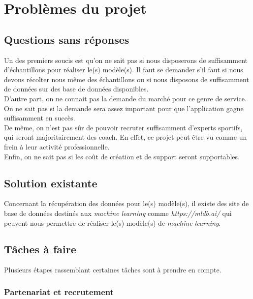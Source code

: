 
\chapter{Problèmes du projet}

\section{Questions sans réponses}

Un des premiers soucis est qu'on ne sait pas si nous disposerons de suffisamment d'échantillons pour réaliser le(s) modèle(s). Il faut se demander s'il faut si nous devons récolter nous même des échantillons ou si nous disposons de suffisamment de données sur des base de données disponibles.\\

D'autre part, on ne connait pas la demande du marché pour ce genre de service. On ne sait pas si la demande sera assez important pour que l'application gagne suffisamment en succès.\\

De même, on n'est pas sûr de pouvoir recruter suffisamment d'experts sportifs, qui seront majoritairement des coach. En effet, ce projet peut être vu comme un frein à leur activité professionnelle.\\ 

Enfin, on ne sait pas si les coût de création et de support seront supportables.  

\section{Solution existante}

Concernant la récupération des données pour le(s) modèle(s), il existe des site de base de données destinés aux \textit{machine learning} comme \textit{https://mldb.ai/} qui peuvent nous permettre de réaliser le(s) modèle(s) de \textit{machine learning}.

\section{Tâches à faire}

Plusieurs étapes rassemblant certaines tâches sont à prendre en compte. 

\subsection*{Partenariat et recrutement}

